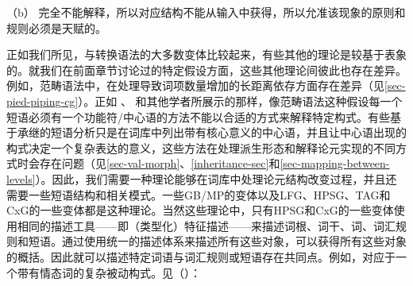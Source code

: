 \zl

（b） 完全不能解释，所以对应结构不能从输入中获得，所以允准该现象的原则和规则必须是天赋的。

正如我们所见，与转换语法的大多数变体比较起来，有些其他的理论是较基于表象的。就我们在前面章节讨论过的特定假设方面，这些其他理论间彼此也存在差异。例如，范畴语法中，在处理导致词项数量增加的长距离依存方面存在差异（见\ref{sec-pied-piping-cg}）。正如 \citet{Jacobs2008a}、 \citet{Jackendoff2008a}和其他学者所展示的那样，像范畴语法这种假设每一个短语必须有一个功能符/中心语的方法不能以合适的方式来解释特定构式。有些基于承继的短语分析只是在词库中列出带有核心意义的中心语，并且让中心语出现的构式决定一个复杂表达的意义，这些方法在处理派生形态和解释论元实现的不同方式时会存在问题（见\ref{sec-val-morph}、\ref{inheritance-sec}和\ref{sec-mapping-between-levels}）。因此，我们需要一种理论能够在词库中处理论元结构改变过程，并且还需要一些短语结构和相关模式。一些GB/MP的变体以及LFG、HPSG、TAG和CxG的一些变体都是这种理论。当然这些理论中，只有HPSG和CxG的一些变体使用相同的描述工具——即（类型化）特征描述——来描述词根、词干、词、词汇规则和短语。通过使用统一的描述体系来描述所有这些对象，可以获得所有这些对象的概括。因此就可以描述特定词语与词汇规则或短语存在共同点。例如，\bard{}对应于一个带有情态词的复杂被动构式。见（）：
